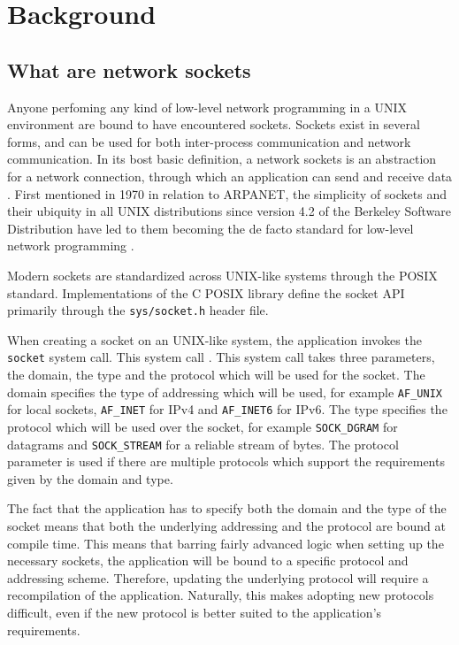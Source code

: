 \chapter{Background} \label{chap:background}
\section{What are network sockets} 
Anyone perfoming any kind of low-level network programming in a UNIX
environment are bound to have encountered sockets. Sockets exist
in several forms, and can be used for both inter-process communication
and network communication. 
In its bost basic definition, a network sockets is an abstraction
for a network connection, through which an application can send
and receive data \cite[p. 8]{donahooTCPIPSockets2009}. 
First mentioned in 1970 in relation to ARPANET, the
simplicity of sockets and their ubiquity in all UNIX distributions
since version 4.2 of the Berkeley Software Distribution have
led to them becoming the de facto standard for low-level network
programming \cite{crockerNewHostHostProtocol1970}\cite[p. 502]{tanenbaumComputerNetworks2011}.

Modern sockets are standardized across UNIX-like systems through
the POSIX standard. Implementations of the C POSIX library define
the socket API primarily through the \texttt{sys/socket.h} header file.

When creating a socket on an UNIX-like system, the application
invokes the \texttt{socket} system call. This system call
 \cite{Socket2LinuxManual}.
This system call takes three parameters, the domain, the type
and the protocol which will be used for the socket.
The domain specifies the type of
addressing which will be used, for example \texttt{AF\_UNIX}
for local sockets, \texttt{AF\_INET} for IPv4 and \texttt{AF\_INET6}
for IPv6. The type specifies the protocol which will be used over the socket, for
example \texttt{SOCK\_DGRAM} for datagrams and \texttt{SOCK\_STREAM}
for a reliable stream of bytes.
The protocol parameter is used if there are multiple protocols
which support the requirements given by the domain and type.

The fact that the application has to specify both the domain
and the type of the socket means that both the
underlying addressing and the protocol are bound at compile time.
This means that barring fairly advanced logic when setting up
the necessary sockets, the application will be bound to a specific
protocol and addressing scheme. Therefore, updating
the underlying protocol will require a recompilation of the application. 
Naturally, this makes adopting new protocols difficult, even
if the new protocol is better suited to the application's requirements.

